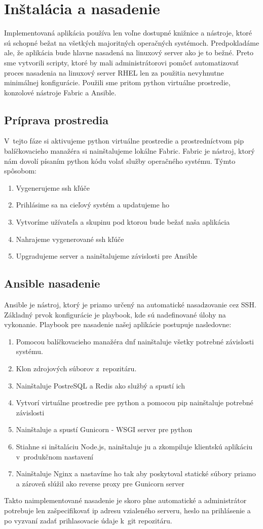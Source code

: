\chapter{Inštalácia a nasadenie}
Implementovaná aplikácia používa len voľne dostupné knižnice a nástroje, ktoré sú schopné bežat na všetkých majoritných operačných systémoch. Predpokladáme ale, že aplikácia bude hlavne nasadená na linuxový server ako je to bežné. Preto sme vytvorili scripty, ktoré by mali administrátorovi pomôcť automatizovať proces nasadenia na linuxový server RHEL len za použitia nevyhnutne minimálnej konfigurácie. Použili sme pritom python virtuálne prostredie, konzolové nástroje Fabric a Ansible.

\section{Príprava prostredia}
V~tejto fáze si aktivujeme python virtuálne prostredie a prostredníctvom pip balíčkovacieho manažéra si nainštalujeme lokálne Fabric.
Fabric je nástroj, ktorý nám dovolí písaním python kódu volať služby operačného systému. Týmto spôsobom: 

\begin{enumerate}
  \item Vygenerujeme ssh kľúče
  \item Prihlásime sa na cieľový systém a updatujeme ho
  \item Vytvoríme užívateľa a skupinu pod ktorou bude bežať naša aplikácia
  \item Nahrajeme vygenerované ssh kľúče
  \item Upgradujeme server a nainštalujeme závislosti pre Ansible
\end{enumerate}

\section{Ansible nasadenie}
Ansible je nástroj, ktorý je priamo určený na automatické nasadzovanie cez SSH. Základný prvok konfigurácie je playbook, kde sú nadefinované úlohy na vykonanie. Playbook pre nasadenie našej aplikácie postupuje nasledovne:

\begin{enumerate}
  \item Pomocou balíčkovacieho manažéra dnf nainštaluje všetky potrebné závislosti systému.
  \item Klon zdrojových súborov z~repozitáru.
  \item Nainštaluje PostreSQL a Redis ako službý a spustí ich
  \item Vytvorí virtuálne prostredie pre python a pomocou pip nainštaluje potrebné závislosti
  \item Nainštaluje a spustí Gunicorn - WSGI server pre python
  \item Stiahne si inštaláciu Node.js, nainštaluje ju a zkompiluje klientskú aplikáciu v~produkčnom nastavení
  \item Nainštaluje Nginx a nastavíme ho tak aby poskytoval statické súbory priamo a zároveň slúžil ako reverse proxy pre Gunicorn server
\end{enumerate}

Takto naimplementované nasadenie je skoro plne automatické a administrátor potrebuje len zašpecifikovať ip adresu vzialeného serveru, heslo na prihlásenie a po vyzvaní zadať prihlasovacie údaje k~git repozitáru.


